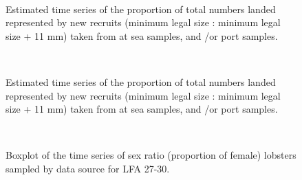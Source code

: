 \documentclass[11pt]{article}
\newcommand{\D}{.}
\newcommand{\e}{/backup/bio_data/bio.lobster/figures/} %
\begin{document}
\begin{landscape}
\begin{figure}
        \centering
         \\
                    
                    \caption{Estimated time series of the proportion of total numbers landed represented by new recruits (minimum legal size : minimum legal size + 11 mm) taken from at sea samples, and /or  port samples. }
        \end{figure}

\begin{figure}
        \centering
         \\
                    
                    \caption{Estimated time series of the proportion of total numbers landed represented by new recruits (minimum legal size : minimum legal size + 11 mm) taken from at sea samples, and /or  port samples. }
        \end{figure}

\end{landscape}


\begin{figure}
        \centering
         \\
                     \caption{Boxplot of the time series of sex ratio (proportion of female) lobsters sampled by data source for LFA 27-30.}
        \end{figure}
\end{document}
